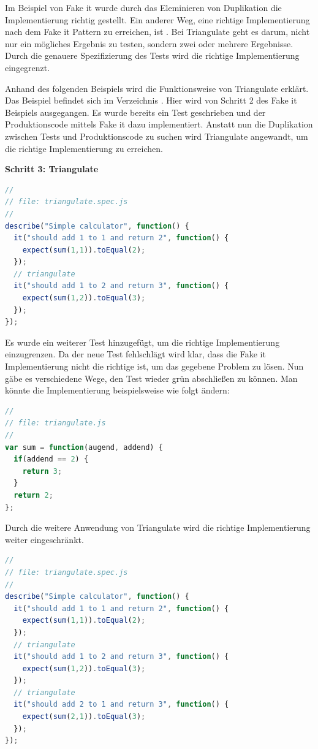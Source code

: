 {Im Beispiel von Fake it wurde durch das Eleminieren von Duplikation die Implementierung richtig gestellt. Ein anderer Weg, eine richtige Implementierung nach dem Fake it Pattern zu erreichen, ist . Bei Triangulate geht es darum, nicht nur ein mögliches Ergebnis zu testen, sondern zwei oder mehrere Ergebnisse. Durch die genauere Spezifizierung des Tests wird die richtige Implementierung eingegrenzt.

Anhand des folgenden Beispiels wird die Funktionsweise von Triangulate erklärt. Das Beispiel befindet sich im Verzeichnis .
Hier wird von Schritt 2 des Fake it Beispiels ausgegangen. Es wurde bereits ein Test geschrieben und der Produktionscode mittels Fake it dazu implementiert. Anstatt nun die Duplikation zwischen Tests und Produktionscode zu suchen wird Triangulate angewandt, um die richtige Implementierung zu erreichen.

\textbf{Schritt 3: Triangulate}
\begin{lstlisting}[language=JavaScript]
//
// file: triangulate.spec.js
//
describe("Simple calculator", function() {
  it("should add 1 to 1 and return 2", function() {
    expect(sum(1,1)).toEqual(2);
  });
  // triangulate
  it("should add 1 to 2 and return 3", function() {
    expect(sum(1,2)).toEqual(3);
  });
});
\end{lstlisting}

Es wurde ein weiterer Test hinzugefügt, um die richtige Implementierung einzugrenzen. Da der neue Test fehlschlägt wird klar, dass die Fake it Implementierung nicht die richtige ist, um das gegebene Problem zu lösen. Nun gäbe es verschiedene Wege, den Test wieder grün abschließen zu können. Man könnte die Implementierung beispielsweise wie folgt ändern:

\begin{lstlisting}[language=JavaScript]
//
// file: triangulate.js
//
var sum = function(augend, addend) {
  if(addend == 2) {
    return 3;
  }
  return 2;
};
\end{lstlisting}

Durch die weitere Anwendung von Triangulate wird die richtige Implementierung weiter eingeschränkt.
\begin{lstlisting}[language=JavaScript]
//
// file: triangulate.spec.js
//
describe("Simple calculator", function() {
  it("should add 1 to 1 and return 2", function() {
    expect(sum(1,1)).toEqual(2);
  });
  // triangulate
  it("should add 1 to 2 and return 3", function() {
    expect(sum(1,2)).toEqual(3);
  });
  // triangulate
  it("should add 2 to 1 and return 3", function() {
    expect(sum(2,1)).toEqual(3);
  });
});


\end{lstlisting}}
